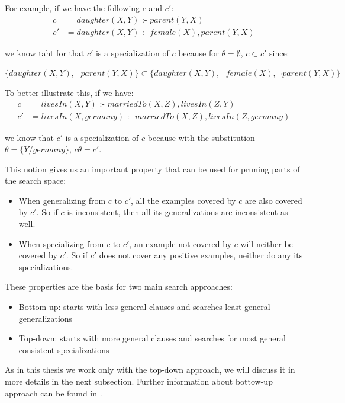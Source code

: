 For example, if we have the following $c$ and $c'$:
\begin{align*}
  c &= daughter(X,Y) \text{ :- } parent(Y,X) \\
  c'&= daughter(X,Y )\text{ :- } female(X),parent(Y,X)
\end{align*}

we know taht for that $c'$ is a specialization of $c$ because for $\theta=\emptyset$, $c \subset c'$ since:
\begin{center}
$\{daughter(X,Y),\neg parent(Y,X)\} \subset \{daughter(X,Y),\neg female(X),\neg parent(Y,X)\}$ 
\end{center}

To better illustrate this, if we have:
\begin{align*}
  c &= livesIn(X,Y) \text{ :- } marriedTo(X,Z),livesIn(Z,Y)\\
  c'&=livesIn(X,germany) \text{ :- } marriedTo(X,Z),livesIn(Z,germany)
\end{align*}

we know that $c'$ is a specialization of $c$ because with the substitution $\theta=\{Y/germany\}$, $c\theta=c'$.

This notion gives us an important property that can be used for pruning parts of the search space:

\begin{itemize}
 \item When generalizing from $c$ to $c'$, all the examples covered by $c$ are also covered by $c'$. So if $c$ is
inconsistent, then all its generalizations are inconsistent as well.
  \item When specializing from $c$ to $c'$, an example not covered by $c$ will neither be covered by $c'$. So if $c'$
does not cover any positive examples, neither do any its specializations.
\end{itemize}

These properties are the basis for two main search approaches:

\begin{itemize}
 \item Bottom-up: starts with less general clauses and searches least general generalizations
 \item Top-down: starts with more general clauses and searches for most general consistent specializations
\end{itemize}

As in this thesis we work only with the top-down approach, we will discuss it in more details in the next subsection.
Further information about bottow-up approach can be found in \cite{DBLP:journals/ml/LavracD96}.

